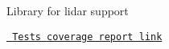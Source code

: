 Library for lidar support

\href{https://lukaskaz.github.io/lib-lidar/coverage/}{\texttt{ Tests coverage report link}} 